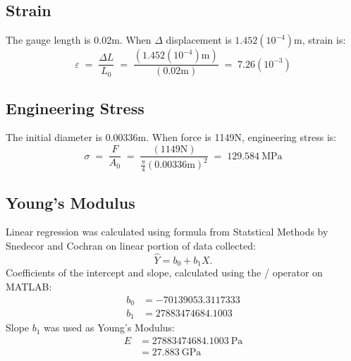 \documentclass[conference, letterpaper]{IEEEtran}
\begin{document}
    \subsection{Strain}
        The gauge length is 0.02m. When \(\Delta \) displacement is \(1.452(10^{-4})\)m, strain is:
        \[
            \varepsilon \;
            =\; \frac{\Delta L}{L_0} \;
            =\; \frac{(1.452(10^{-4})\text{m})}{(0.02\text{m})} \;
            =\; 7.26(10^{-3})
        \]
    \subsection{Engineering Stress}
        The initial diameter is 0.00336m. When force is 1149N, engineering stress is:
        \[
            \sigma \;
            =\; \frac{F}{A_0} \;
            =\; \frac{(1149\text{N})}{\frac{\pi}{4} {(0.00336\text{m})}^2} \;
            =\; 129.584\ \text{MPa}
        \]
    \subsection{Young's Modulus}
        Linear regression was calculated using formula from Statstical Methods by Snedecor and Cochran\cite{SNEDECOR1989} on linear portion of data collected:
        \[
            \hat{Y} = b_0 + b_{1}X.
        \]
        Coefficients of the intercept and slope, calculated using the / operator on MATLAB:\@
        \begin{align*}
            b_0
            &= -70139053.3117333 \\
            b_1
            &= 27883474684.1003
        \end{align*}
        Slope \(b_1\) was used as Young's Modulus:
        \begin{align*}
            E
            &= 27883474684.1003\ \text{Pa} \\
            &= 27.883\ \text{GPa}
        \end{align*}
\end{document}
